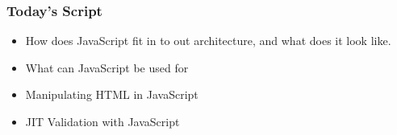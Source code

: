 \documentclass[dvipsnames]{beamer}
\subtitle{Introduction To JavaScript}
\begin{document}
\begin{frame}
  \titlepage{}
\end{frame}

\begin{frame} 
\frametitle{Today's Script}

\begin{itemize}
\item How does JavaScript fit in to out architecture, and what does it
  look like.
\item What can JavaScript be used for
\item Manipulating HTML in JavaScript
\item JIT Validation with JavaScript
\end{itemize}
  
\end{frame}
\end{document}
